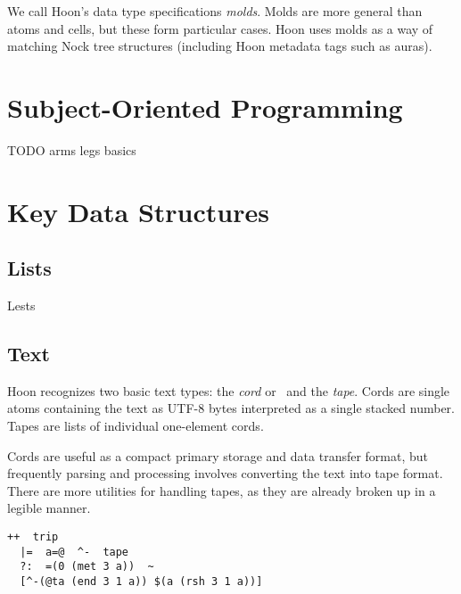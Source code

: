 We call Hoon's data type specifications \emph{molds}.  Molds are more general than atoms and cells, but these form particular cases.  Hoon uses molds as a way of matching Nock tree structures (including Hoon metadata tags such as auras).

\section{Subject-Oriented Programming}

TODO
arms legs basics


\section{Key Data Structures}

\subsection{Lists}


Lests

\subsection{Text}


Hoon recognizes two basic text types:  the \emph{cord} or \patt~and the \emph{tape}.  Cords are single atoms containing the text as UTF-8 bytes interpreted as a single stacked number.  Tapes are lists of individual one-element cords.


Cords are useful as a compact primary storage and data transfer format, but frequently parsing and processing involves converting the text into tape format.  There are more utilities for handling tapes, as they are already broken up in a legible manner.

\begin{lstlisting}[language=hoon,
                   style=nonumbers]
++  trip
  |=  a=@  ^-  tape
  ?:  =(0 (met 3 a))  ~
  [^-(@ta (end 3 1 a)) $(a (rsh 3 1 a))]
\end{lstlisting}


